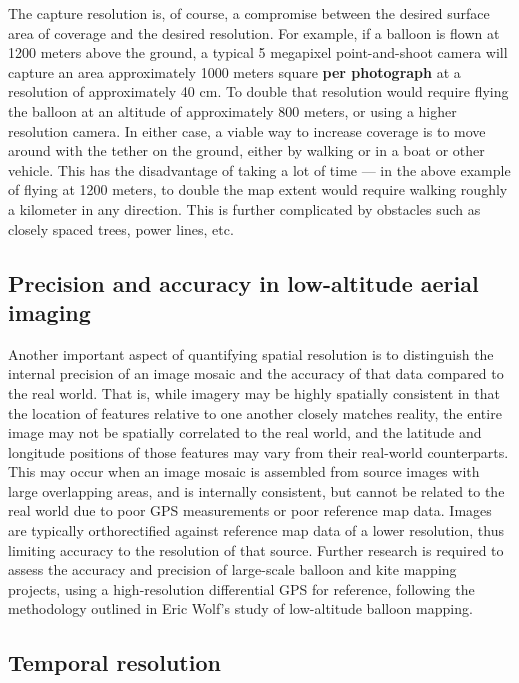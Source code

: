 \documentclass[11pt,oneside,notitlepage]{report}
\begin{document}
The capture resolution is, of course, a compromise between the desired surface area of coverage and the desired resolution. For example, if a balloon is flown at 1200 meters above the ground, a typical 5 megapixel point-and-shoot camera will capture an area approximately 1000 meters square \textbf{per photograph} at a resolution of approximately 40 cm. To double that resolution would require flying the balloon at an altitude of approximately 800 meters, or using a higher resolution camera. In either case, a viable way to increase coverage is to move around with the tether on the ground, either by walking or in a boat or other vehicle. This has the disadvantage of taking a lot of time --- in the above example of flying at 1200 meters, to double the map extent would require walking roughly a kilometer in any direction. This is further complicated by obstacles such as closely spaced trees, power lines, etc.

\subsection{Precision and accuracy in low-altitude aerial imaging}
\label{subsec:precision}

Another important aspect of quantifying spatial resolution is to distinguish the internal precision of an image mosaic and the accuracy of that data compared to the real world. That is, while imagery may be highly spatially consistent in that the location of features relative to one another closely matches reality, the entire image may not be spatially correlated to the real world, and the latitude and longitude positions of those features may vary from their real-world counterparts. This may occur when an image mosaic is assembled from source images with large overlapping areas, and is internally consistent, but cannot be related to the real world due to poor GPS measurements or poor reference map data. Images are typically orthorectified against reference map data of a lower resolution, thus limiting accuracy to the resolution of that source. Further research is required to assess the accuracy and precision of large-scale balloon and kite mapping projects, using a high-resolution differential GPS for reference, following the methodology outlined in Eric Wolf's study of low-altitude balloon mapping. \cite{wolf2006lowcost}

\subsection{Temporal resolution}
\end{document}
